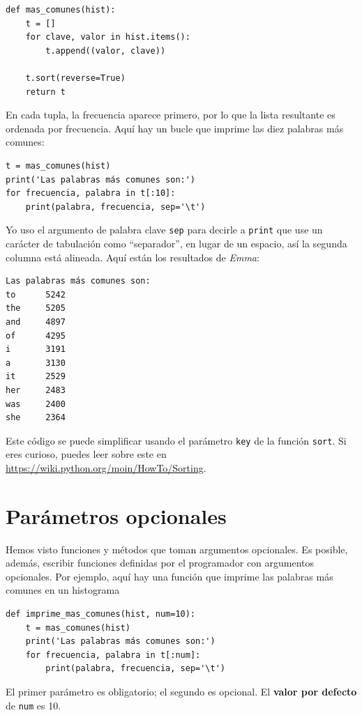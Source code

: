 \documentclass[10pt]{book}
\begin{document}
\begin{verbatim}
def mas_comunes(hist):
    t = []
    for clave, valor in hist.items():
        t.append((valor, clave))

    t.sort(reverse=True)
    return t
\end{verbatim}

En cada tupla, la frecuencia aparece primero, por lo que la lista resultante es
ordenada por frecuencia.  Aquí hay un bucle que imprime las diez palabras más
comunes:

\begin{verbatim}
t = mas_comunes(hist)
print('Las palabras más comunes son:')
for frecuencia, palabra in t[:10]:
    print(palabra, frecuencia, sep='\t')
\end{verbatim}
%
Yo uso el argumento de palabra clave {\tt sep} para decirle a {\tt print} que use un
carácter de tabulación como ``separador'', en lugar de un espacio, así la segunda
columna está alineada.  Aquí están los resultados de {\em Emma}:

\begin{verbatim}
Las palabras más comunes son:
to      5242
the     5205
and     4897
of      4295
i       3191
a       3130
it      2529
her     2483
was     2400
she     2364
\end{verbatim}
%
Este código se puede simplificar usando el parámetro {\tt key} de
la función {\tt sort}.  Si eres curioso, puedes leer sobre este
en \url{https://wiki.python.org/moin/HowTo/Sorting}.


\section{Parámetros opcionales}

Hemos visto funciones y métodos que toman argumentos
opcionales.  Es posible, además, escribir funciones definidas por el programador
con argumentos opcionales.  Por ejemplo, aquí hay una función que
imprime las palabras más comunes en un histograma

\begin{verbatim}
def imprime_mas_comunes(hist, num=10):
    t = mas_comunes(hist)
    print('Las palabras más comunes son:')
    for frecuencia, palabra in t[:num]:
        print(palabra, frecuencia, sep='\t')
\end{verbatim}

El primer parámetro es obligatorio; el segundo es opcional.
El {\bf valor por defecto} de {\tt num} es 10.
\end{document}
